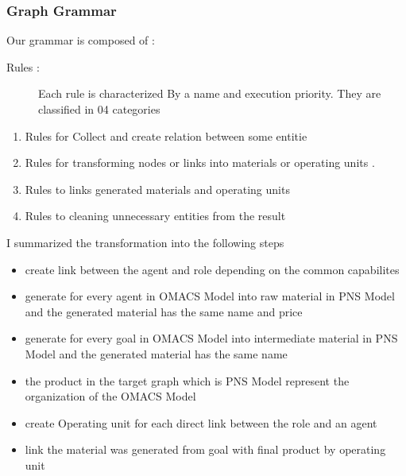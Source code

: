 \subsubsection{ Graph Grammar }
Our grammar is composed of :
\begin{description}

\item [{Rules :}]  

Each rule is characterized
By a name and execution priority. They are classified in 04 categories

\end{description}

\begin{enumerate}
\item Rules for Collect and create relation between some entitie
\item Rules for transforming nodes or links into materials or operating units .
\item Rules to links generated materials and operating units
\item Rules to cleaning unnecessary entities from the result 

\end{enumerate}
I summarized the transformation into the following steps  

\begin{itemize}

\item create link between the agent and role depending on the common capabilites

\item generate for every agent in OMACS Model into raw material in PNS Model
and the generated material has the same name and price 

\item generate for every goal in OMACS Model into intermediate material in PNS Model and the generated material has the same name  


\item the product in the target graph which is PNS Model represent the organization of the OMACS Model

\item create Operating unit for each direct link between the role and an agent 

\item link the material was generated from goal with final product by operating unit

\end{itemize}

